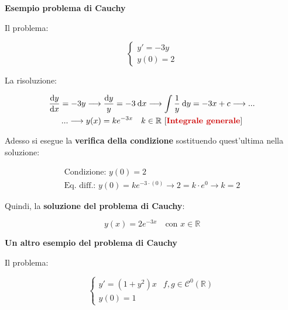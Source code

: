 \documentclass[a4paper]{article}
\begin{document}
	\vspace{1em}

	\begin{center}
		\large \textcolor{Green4}{\textbf{Esempio problema di Cauchy}}
	\end{center}

	\noindent
	Il problema:
	
	\begin{equation*}
		\begin{cases}
			y' = -3y \\
			y(0) = 2
		\end{cases}
	\end{equation*}

	\noindent
	La risoluzione:
	
	\begin{gather*}
		\dfrac{\mathrm{d}y}{\mathrm{d}x} = - 3y \longrightarrow \dfrac{\mathrm{d}y}{y} = - 3 \: \mathrm{d}x \longrightarrow  \displaystyle \int {\dfrac{1}{y} \: \mathrm{d}y} = -3x + c \longrightarrow ...\\
		... \longrightarrow y(x) = k e^{-3x} \hspace{1em} k \in \mathbb{R} \text{ [}\textcolor{Red3}{\textbf{Integrale generale}}\text{]}
	\end{gather*}

	\noindent
	Adesso si esegue la \textbf{verifica della condizione} sostituendo quest'ultima nella soluzione:
	
	\begin{gather*}
		\text{Condizione: } y(0) = 2 \\
		\text{Eq. diff.: } y(0) = k e^{-3 \cdot (0)} \longrightarrow 2 = k \cdot e^0 \longrightarrow k = 2
	\end{gather*}

	\noindent
	Quindi, la \textbf{soluzione del problema di Cauchy}:
	
	\begin{equation*}
		y(x) = 2 e^{-3x} \hspace{1em} \text{con } x \in \mathbb{R}
	\end{equation*}

	\newpage
	
	\begin{center}
		\large \textcolor{Green4}{\textbf{Un altro esempio del problema di Cauchy}}
	\end{center}

	\noindent
	Il problema:
	
	\begin{equation*}
		\begin{cases}
			y' = (1 + y^2) x & f, g \in \mathcal{C}^0 \left(\mathbb{R}\right) \\
			y(0) = 1
		\end{cases}
	\end{equation*}
\end{document}
